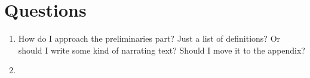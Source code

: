 \documentclass[12pt,a4paper]{article}
\DeclareMathOperator{\Set}{Set}
\DeclareMathOperator{\Frm}{Frm}
\DeclareMathOperator{\Top}{Top}
\def\HomA{\ensuremath\mathcal{A}}
\begin{document}
\section{Questions}
\begin{enumerate}
	\item How do I approach the preliminaries part? Just a list of definitions? Or should I write some kind of narrating text? Should I move it to the appendix?
	\item 
\end{enumerate}
\end{document}
